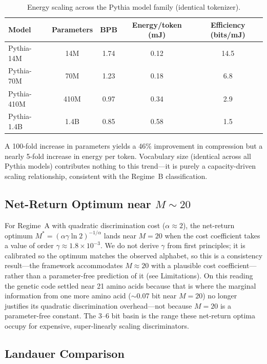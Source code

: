 \documentclass[11pt]{article}
\begin{document}
\begin{table}[ht]
\centering
\caption{Energy scaling across the Pythia model family (identical tokenizer).}
\begin{tabular}{lcccc}
\toprule
Model & Parameters & BPB & Energy/token (mJ) & Efficiency (bits/mJ) \\
\midrule
Pythia-14M & 14M & 1.74 & 0.12 & 14.5 \\
Pythia-70M & 70M & 1.23 & 0.18 & 6.8 \\
Pythia-410M & 410M & 0.97 & 0.34 & 2.9 \\
Pythia-1.4B & 1.4B & 0.85 & 0.58 & 1.5 \\
\bottomrule
\end{tabular}
\label{tab:pythia}
\end{table}

A 100-fold increase in parameters yields a 46\% improvement in compression but a nearly 5-fold increase in energy per token. Vocabulary size (identical across all Pythia models) contributes nothing to this trend---it is purely a capacity-driven scaling relationship, consistent with the Regime~B classification.

\subsection{Net-Return Optimum near $M \sim 20$}

For Regime~A with quadratic discrimination cost ($\alpha\approx 2$), the net-return optimum $M^*=(\alpha\gamma\ln 2)^{-1/\alpha}$ lands near $M=20$ when the cost coefficient takes a value of order $\gamma\approx1.8\times10^{-3}$. We do not derive $\gamma$ from first principles; it is calibrated so the optimum matches the observed alphabet, so this is a consistency result---the framework accommodates $M\approx20$ with a plausible cost coefficient---rather than a parameter-free prediction of it (see Limitations). On this reading the genetic code settled near 21 amino acids because that is where the marginal information from one more amino acid ($\sim$0.07 bit near $M=20$) no longer justifies its quadratic discrimination overhead---not because $M=20$ is a parameter-free constant. The 3--6 bit basin is the range these net-return optima occupy for expensive, super-linearly scaling discriminators.

\subsection{Landauer Comparison}
\end{document}
